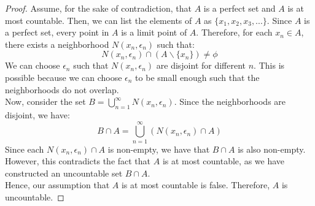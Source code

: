 \documentclass[openany]{book}
\begin{document}
\begin{proof}
    Assume, for the sake of contradiction, that $A$ is a perfect set and $A$ is at most countable. Then, we can list the elements of $A$ as $\{x_1, x_2, x_3, ...\}$. Since $A$ is a perfect set, every point in $A$ is a limit point of $A$. Therefore, for each $x_n \in A$, there exists a neighborhood $N(x_n, \epsilon_n)$ such that:
    $$N(x_n, \epsilon_n) \cap (A \backslash \{x_n\}) \neq \phi$$
    We can choose $\epsilon_n$ such that $N(x_n, \epsilon_n)$ are disjoint for different $n$. This is possible because we can choose $\epsilon_n$ to be small enough such that the neighborhoods do not overlap. \\
    Now, consider the set $B = \bigcup_{n=1}^{\infty} N(x_n, \epsilon_n)$. Since the neighborhoods are disjoint, we have:
    $$B \cap A = \bigcup_{n=1}^{\infty} (N(x_n, \epsilon_n) \cap A)$$
    Since each $N(x_n, \epsilon_n) \cap A$ is non-empty, we have that $B \cap A$ is also non-empty. However, this contradicts the fact that $A$ is at most countable, as we have constructed an uncountable set $B \cap A$. \\ 
    Hence, our assumption that $A$ is at most countable is false. Therefore, $A$ is uncountable.
\end{proof}
\end{document}
